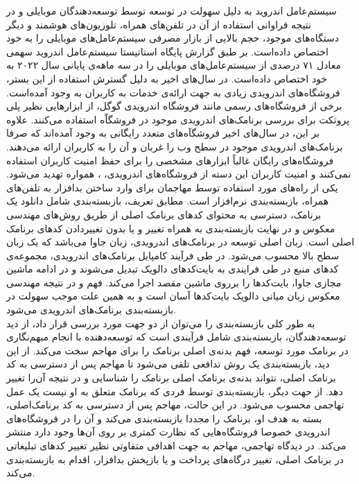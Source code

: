  سیستم‌عامل اندروید به دلیل سهولت در توسعه توسط توسعه‌دهندگان موبایلی و در نتیجه فراوانی استفاده از آن در تلفن‌های همراه، تلوزیون‌های هوشمند و دیگر دستگاه‌های موجود، حجم بالایی از بازار مصرفی سیستم‌عامل‌های موبایلی را به خود اختصاص داده‌است. بر طبق گزارش پایگاه استاتیستا  سیستم‌عامل اندروید سهمی معادل ۷۱ درصدی از سیستم‌عامل‌های موبایلی را در سه‌ ماهه‌ی پایانی سال ۲۰۲۲ به خود اختصاص داده‌است. در سال‌های اخیر به دلیل گسترش استفاده از این بستر، فروشگاه‌های اندرویدی زیادی به جهت ارائه‌ی خدمات به کاربران به وجود آمده‌است. برخی‌ از فروشگاه‌های رسمی مانند فروشگاه اندرویدی گوگل، از ابزار‌هایی نظیر پلی پروتکت  برای بررسی برنامک‌های اندرویدی موجود در فروشگاّه‌ استفاده می‌کنند. علاوه بر این، در سال‌های اخیر فروشگآه‌های متعدد رایگانی به وجود آمده‌اند که صرفا برنامک‌های اندرویدی موجود در سطح وب را غربان و آن را به کاربران ارائه‌ می‌دهند. فروشگاه‌های رایگان غالباً ابزار‌های مشخصی را برای حفظ امنیت کاربران استفاده نمی‌کنند و امنیت کاربران این دسته از فروشگاه‌های اندرویدی،  ، همواره تهدید می‌شود. یکی از راه‌های مورد استفاده توسط مهاجمان برای وارد ساختن بدافزار به تلفن‌های همراه، بازبسته‌بندی نرم‌افزار است. مطابق تعریف، بازبسته‌بندی شامل دانلود یک برنامک، دسترسی به محتوای کد‌های برنامک اصلی از طریق روش‌های مهندسی معکوس و در نهایت بازبسته‌بندی به همراه تغییر و یا بدون تغییر‌دادن کد‌های برنامک‌ اصلی است. زبان اصلی توسعه در برنامک‌های اندرویدی، زبان جاوا می‌باشد که یک زبان سطح بالا محسوب می‌شود. در طی فرآیند کامپایل برنامک‌های اندرویدی، مجموعه‌ی کد‌های منبع در طی فرایندی به بایت‌کد‌های دالویک تبدیل می‌شوند و در ادامه ماشین مجازی جاوا، بایت‌کد‌ها را برروی ماشین مقصد اجرا می‌کند. فهم و در نتیجه مهندسی معکوس زبان میانی دالویک بایت‌کد‌ها آسان است و به همین علت موجب سهولت در بازبسته‌بندی برنامک‌های اندرویدی می‌شود.\\
 به طور کلی بازبسته‌بندی را می‌توان از دو جهت مورد بررسی قرار داد، از دید توسعه‌دهندگان، بازبسته‌بندی شامل فرآیندی است که توسعه‌دهنده با انجام مبهم‌نگاری در برنامک مورد توسعه، فهم بدنه‌ی اصلی برنامک را برای مهاجم سخت می‌کند. از این دید، بازبسته‌بندی یک روش تدافعی تلقی می‌شود تا مهاجم پس از دسترسی به کد برنامک اصلی، نتواند بدنه‌ی برنامک اصلی برنامک را شناسایی و در نتیجه آن‌را تغییر دهد. از حهت دیگر، بازبسته‌بندی توسط فردی که برنامک متعلق به او نیست یک عمل تهاجمی محسوب می‌شود. در این حالت، مهاجم پس از دسترسی به کد برنامک‌اصلی، بسته به هدف او، برنامک‌ را مجددا بازبسته‌بندی می‌کند و آن را در فروشگاه‌های اندرویدی خصوصا فروشگاه‌هایی که نظارت کمتری بر روی آن‌ها وجود دارد منتشر می‌کند. در دیدگاه تهاجمی، مهاجم به جهت اهدافی متفاوتی نظیر تغییر کد‌های تبلیغاتی در برنامک اصلی، تغییر درگاه‌های پرداخت و یا بازپخش بدافزار، اقدام به بازبسته‌بندی می‌کند.
